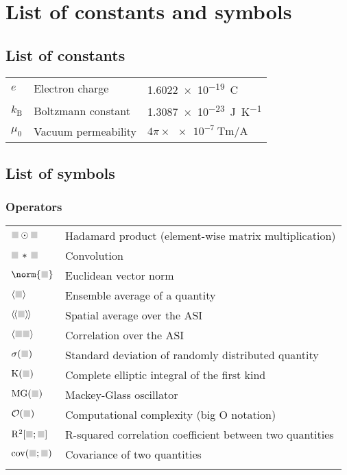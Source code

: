 \chapter{List of constants and symbols}  %
\section*{List of constants}
\begin{longtable}[l]{p{60pt} p{140pt} p{200pt}}
	$e$ & Electron charge & \SI{1.6022e-19}{\coulomb} \\
	$k_\mathrm{B}$ & Boltzmann constant & \SI{1.3087e-23}{\joule\per\kelvin} \\
	$\mu_0$ & Vacuum permeability & $4 \pi \times \SI{e-7}{\tesla\metre\per\ampere}$ \\
\end{longtable}

\section*{List of symbols}
\subsection*{Operators}
\begin{longtable}[l]{p{60pt} p{350pt}}
	$\greybox \odot \greybox$ & Hadamard product (element-wise matrix multiplication) \\
	$\greybox \hspace{0.15em} * \hspace{0.15em} \greybox$ & Convolution \\
	$\norm{ \greybox }$ & Euclidean vector norm \\
	$\langle \greybox \rangle$ & Ensemble average of a quantity \\
	$\llangle \greybox \rrangle$ & Spatial average over the ASI \\
	$\langle \greybox \greybox \rangle$ & Correlation over the ASI \\
	$\sigma( \greybox )$ & Standard deviation of randomly distributed quantity \\
	$\mathrm{K}(\greybox)$ & Complete elliptic integral of the first kind \\
	$\mathrm{MG}(\greybox)$ & Mackey-Glass oscillator \\
	$\mathcal{O}(\greybox)$ & Computational complexity (big O notation) \\
	$\mathrm{R}^2[\greybox;\greybox]$ & R-squared correlation coefficient between two quantities \\
	$\mathrm{cov}(\greybox;\greybox)$ & Covariance of two quantities \\
	&\\
\end{longtable}

